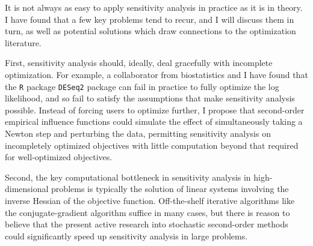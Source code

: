 It is not always as easy to apply sensitivity analysis in practice as it is in
theory.  I have found that a few key problems tend to recur, and I will discuss
them in turn, as well as potential solutions which draw connections to the
optimization literature.

First, sensitivity analysis should, ideally, deal gracefully with incomplete
optimization.  For example, a collaborator from biostatistics and I have found
that the \texttt{R} package \texttt{DESeq2} package can fail in
practice to fully optimize the log likelihood, and so fail to satisfy the
assumptions that make sensitivity analysis possible.  Instead of forcing users
to optimize further, I propose that second-order empirical influence functions
could simulate the effect of simultaneously taking a Newton step and perturbing
the data, permitting sensitivity analysis on incompletely optimized objectives
with little computation beyond that required for well-optimized objectives.

%
%

Second, the key computational bottleneck in sensitivity analysis in
high-dimensional problems is typically the solution of linear systems involving
the inverse Hessian of the objective function. Off-the-shelf iterative
algorithms like the conjugate-gradient algorithm %
suffice in many cases, but there is reason to believe that the present active
research into stochastic second-order methods
could significantly speed up sensitivity analysis in large problems.

